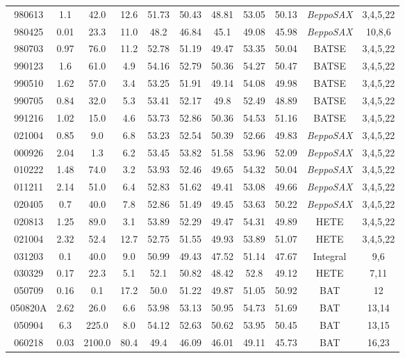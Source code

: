 \documentclass[12pt]{article}
\begin{document}
\begin{landscape}
\begin{longtable}{ccccccccccc}
980613 & 1.1 & 42.0 & 12.6 & 51.73 & 50.43 & 48.81 & 53.05 & 50.13 & \textit{BeppoSAX} & 3,4,5,22 \\
980425 & 0.01 & 23.3 & 11.0 & 48.2 & 46.84 & 45.1 & 49.08 & 45.98 & \textit{BeppoSAX} & 10,8,6 \\
980703 & 0.97 & 76.0 & 11.2 & 52.78 & 51.19 & 49.47 & 53.35 & 50.04 & BATSE & 3,4,5,22 \\
990123 & 1.6 & 61.0 & 4.9 & 54.16 & 52.79 & 50.36 & 54.27 & 50.47 & BATSE & 3,4,5,22 \\
990510 & 1.62 & 57.0 & 3.4 & 53.25 & 51.91 & 49.14 & 54.08 & 49.98 & BATSE & 3,4,5,22 \\
990705 & 0.84 & 32.0 & 5.3 & 53.41 & 52.17 & 49.8 & 52.49 & 48.89 & BATSE & 3,4,5,22 \\
991216 & 1.02 & 15.0 & 4.6 & 53.73 & 52.86 & 50.36 & 54.53 & 51.16 & BATSE & 3,4,5,22 \\
021004 & 0.85 & 9.0 & 6.8 & 53.23 & 52.54 & 50.39 & 52.66 & 49.83 & \textit{BeppoSAX} & 3,4,5,22 \\
000926 & 2.04 & 1.3 & 6.2 & 53.45 & 53.82 & 51.58 & 53.96 & 52.09 & \textit{BeppoSAX} & 3,4,5,22 \\
010222 & 1.48 & 74.0 & 3.2 & 53.93 & 52.46 & 49.65 & 54.32 & 50.04 & \textit{BeppoSAX} & 3,4,5,22 \\
011211 & 2.14 & 51.0 & 6.4 & 52.83 & 51.62 & 49.41 & 53.08 & 49.66 & \textit{BeppoSAX} & 3,4,5,22 \\
020405 & 0.7 & 40.0 & 7.8 & 52.86 & 51.49 & 49.45 & 53.63 & 50.22 & \textit{BeppoSAX} & 3,4,5,22 \\
020813 & 1.25 & 89.0 & 3.1 & 53.89 & 52.29 & 49.47 & 54.31 & 49.89 & HETE & 3,4,5,22 \\
021004 & 2.32 & 52.4 & 12.7 & 52.75 & 51.55 & 49.93 & 53.89 & 51.07 & HETE & 3,4,5,22 \\
031203 & 0.1 & 40.0 & 9.0 & 50.99 & 49.43 & 47.52 & 51.14 & 47.67 & Integral & 9,6 \\
030329 & 0.17 & 22.3 & 5.1 & 52.1 & 50.82 & 48.42 & 52.8 & 49.12 & HETE & 7,11 \\
050709 & 0.16 & 0.1 & 17.2 & 50.0 & 51.22 & 49.87 & 51.05 & 50.92 & BAT & 12 \\
050820A & 2.62 & 26.0 & 6.6 & 53.98 & 53.13 & 50.95 & 54.73 & 51.69 & BAT & 13,14 \\
050904 & 6.3 & 225.0 & 8.0 & 54.12 & 52.63 & 50.62 & 53.95 & 50.45 & BAT & 13,15 \\
060218 & 0.03 & 2100.0 & 80.4 & 49.4 & 46.09 & 46.01 & 49.11 & 45.73 & BAT & 16,23 \\

\end{longtable}
\end{landscape}
\end{document}
